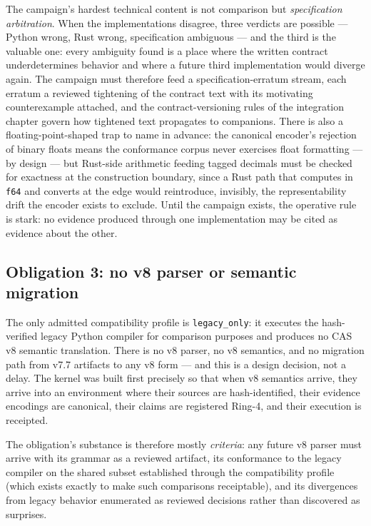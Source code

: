 The campaign's hardest technical content is not comparison but \emph{specification arbitration}. When the implementations disagree, three verdicts are possible --- Python wrong, Rust wrong, specification ambiguous --- and the third is the valuable one: every ambiguity found is a place where the written contract underdetermines behavior and where a future third implementation would diverge again. The campaign must therefore feed a specification-erratum stream, each erratum a reviewed tightening of the contract text with its motivating counterexample attached, and the contract-versioning rules of the integration chapter govern how tightened text propagates to companions. There is also a floating-point-shaped trap to name in advance: the canonical encoder's rejection of binary floats means the conformance corpus never exercises float formatting --- by design --- but Rust-side arithmetic feeding tagged decimals must be checked for exactness at the construction boundary, since a Rust path that computes in \texttt{f64} and converts at the edge would reintroduce, invisibly, the representability drift the encoder exists to exclude. Until the campaign exists, the operative rule is stark: no evidence produced through one implementation may be cited as evidence about the other.

\subsection{Obligation 3: no v8 parser or semantic migration}\label{evid:ob:parser}

The only admitted compatibility profile is \texttt{legacy\_only}: it executes the hash-verified legacy Python compiler for comparison purposes and produces no CAS v8 semantic translation. There is no v8 parser, no v8 semantics, and no migration path from v7.7 artifacts to any v8 form --- and this is a design decision, not a delay. The kernel was built first precisely so that when v8 semantics arrive, they arrive into an environment where their sources are hash-identified, their evidence encodings are canonical, their claims are registered Ring-4, and their execution is receipted.

The obligation's substance is therefore mostly \emph{criteria}: any future v8 parser must arrive with its grammar as a reviewed artifact, its conformance to the legacy compiler on the shared subset established through the compatibility profile (which exists exactly to make such comparisons receiptable), and its divergences from legacy behavior enumerated as reviewed decisions rather than discovered as surprises.

